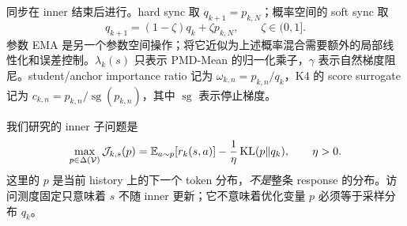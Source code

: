 同步在 inner 结束后进行。hard sync 取 $ q_{k+1}= p_{k,N}$；概率空间的 soft sync 取
\begin{equation}
q_{k+1}=(1-\zeta) q_k+\zeta p_{k,N},\qquad\zeta\in(0,1].
\end{equation}
参数 EMA 是另一个参数空间操作；将它近似为上述概率混合需要额外的局部线性化和误差控制。$\lambda_k(s)$ 只表示 PMD-Mean 的归一化乘子，$\gamma$ 表示自然梯度阻尼。student/anchor importance ratio 记为 $\omega_{k,n}= p_{k,n}/ q_k$，K4 的 score surrogate 记为 $c_{k,n}= p_{k,n}/\operatorname{sg}( p_{k,n})$，其中 $\operatorname{sg}$ 表示停止梯度。

我们研究的 inner 子问题是
\begin{equation}\label{eq:common-objective}
 \max_{p\in\Delta(\mathcal V)}
 \mathcal J_{k,s}(p)
 =\mathbb E_{a\sim p}[r_k(s,a)]-
 \frac{1}{\eta}\operatorname{KL}(p\Vert q_k),
 \qquad \eta>0.
\end{equation}
这里的 $p$ 是当前 history 上的下一个 token 分布，\emph{不是}整条 response 的分布。访问测度固定只意味着 $s$ 不随 inner 更新；它不意味着优化变量 $p$ 必须等于采样分布 $ q_k$。
